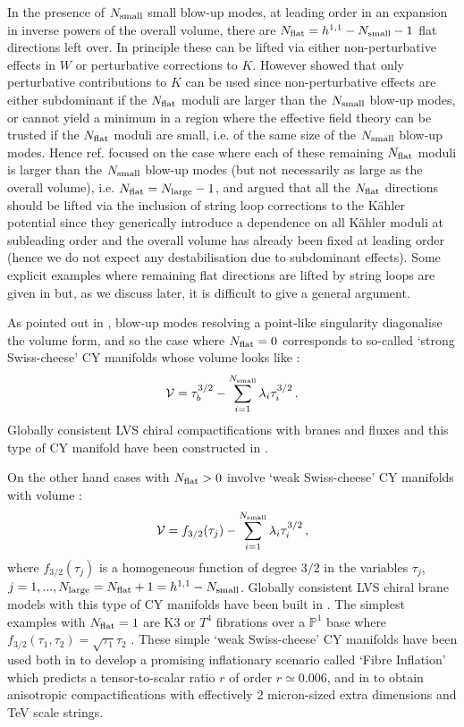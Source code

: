 \documentclass[11pt,a4paper]{article}
\newcommand{\be}{\begin{equation}}
\newcommand{\ee}{\end{equation}}
\newcommand\vo{{\mathcal{V}}}
\begin{document}
In the presence of $N_{\rm small}$ small blow-up modes, at leading order in an expansion in inverse powers of the overall volume, there are $N_{\rm flat}= h^{1,1}-N_{\rm small}-1$ flat directions left over. In principle these can be lifted via either non-perturbative effects in $W$ or perturbative corrections to $K$. However \cite{Cicoli:2008va} showed that only perturbative contributions to $K$ can be used since non-perturbative effects are either subdominant if the $N_{\rm flat}$ moduli are larger than the $N_{\rm small}$ blow-up modes, or cannot yield a minimum in a region where the effective field theory can be trusted if the $N_{\rm flat}$ moduli are small, i.e. of the same size of the $N_{\rm small}$ blow-up modes. Hence ref. \cite{Cicoli:2008va} focused on the case where each of these remaining $N_{\rm flat}$ moduli is larger than the $N_{\rm small}$ blow-up modes (but not necessarily as large as the overall volume), i.e. $N_{\rm flat}= N_{\rm large}-1$, and argued that all the $N_{\rm flat}$ directions should be lifted via the inclusion of string loop corrections to the K\"ahler potential \cite{Berg:2007wt, Cicoli:2007xp} since they generically introduce a dependence on all K\"ahler moduli at subleading order and the overall volume has already been fixed at leading order (hence we do not expect any destabilisation due to subdominant effects). Some explicit examples where remaining flat directions are lifted by string loops are given in \cite{Cicoli:2007xp,Cicoli:2008va} but, as we discuss later, it is difficult to give a general argument. 

As pointed out in \cite{Cicoli:2011it}, blow-up modes resolving a point-like singularity diagonalise the volume form, and so the case where $N_{\rm flat}=0$ corresponds to so-called `strong Swiss-cheese' CY manifolds whose volume looks like \cite{Gray:2012jy}:
\be
\vo = \tau_b^{3/2}-\sum_{i=1}^{N_{\rm small}}\lambda_i\tau_i^{3/2}\,.
\ee
Globally consistent LVS chiral compactifications with branes and fluxes and this type of CY manifold have been constructed in \cite{CYembedding}. 

On the other hand cases with $N_{\rm flat}>0$ involve `weak Swiss-cheese' CY manifolds with volume \cite{Cicoli:2011it}:
\be
\vo = f_{3/2}(\tau_j)-\sum_{i=1}^{N_{\rm small}}\lambda_i\tau_i^{3/2}\,,
\label{weak}
\ee
where $f_{3/2}(\tau_j)$ is a homogeneous function of degree $3/2$ in the variables $\tau_j$, $j=1,...,N_{\rm large}=N_{\rm flat}+1 = h^{1,1}-N_{\rm small}$. Globally consistent LVS chiral brane models with this type of CY manifolds have been built in \cite{Cicoli:2011qg}. The simplest examples with $N_{\rm flat}=1$ are K3 or $T^4$ fibrations over a $\mathbb{P}^1$ base where $f_{3/2}(\tau_1,\tau_2)=\sqrt{\tau_1}\tau_2$ \cite{Cicoli:2011it}. These simple `weak Swiss-cheese' CY manifolds have been used both in \cite{Cicoli:2008gp} to develop a promising inflationary scenario called `Fibre Inflation' which predicts a tensor-to-scalar ratio $r$ of order $r\simeq 0.006$, and in \cite{Cicoli:2011yy} to obtain anisotropic compactifications with effectively 2 micron-sized extra dimensions and TeV scale strings. 
\end{document}
